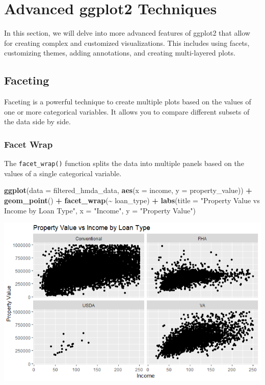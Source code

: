 \documentclass[
]{book}
\newenvironment{Shaded}{\begin{snugshade}}{\end{snugshade}}
\newcommand{\AttributeTok}[1]{\textcolor[rgb]{0.13,0.29,0.53}{#1}}
\newcommand{\FunctionTok}[1]{\textcolor[rgb]{0.13,0.29,0.53}{\textbf{#1}}}
\newcommand{\NormalTok}[1]{#1}
\newcommand{\SpecialCharTok}[1]{\textcolor[rgb]{0.81,0.36,0.00}{\textbf{#1}}}
\newcommand{\StringTok}[1]{\textcolor[rgb]{0.31,0.60,0.02}{#1}}
\begin{document}
\hypertarget{advanced-ggplot2-techniques}{%
\section{Advanced ggplot2 Techniques}\label{advanced-ggplot2-techniques}}

In this section, we will delve into more advanced features of ggplot2 that allow for creating complex and customized visualizations. This includes using facets, customizing themes, adding annotations, and creating multi-layered plots.

\hypertarget{faceting}{%
\subsection{Faceting}\label{faceting}}

Faceting is a powerful technique to create multiple plots based on the values of one or more categorical variables. It allows you to compare different subsets of the data side by side.

\hypertarget{facet-wrap}{%
\subsubsection*{Facet Wrap}\label{facet-wrap}}

The \texttt{facet\_wrap()} function splits the data into multiple panels based on the values of a single categorical variable.

\begin{Shaded}
\begin{Highlighting}[]
\FunctionTok{ggplot}\NormalTok{(}\AttributeTok{data =}\NormalTok{ filtered\_hmda\_data, }\FunctionTok{aes}\NormalTok{(}\AttributeTok{x =}\NormalTok{ income, }\AttributeTok{y =}\NormalTok{ property\_value)) }\SpecialCharTok{+}
  \FunctionTok{geom\_point}\NormalTok{() }\SpecialCharTok{+}
  \FunctionTok{facet\_wrap}\NormalTok{(}\SpecialCharTok{\textasciitilde{}}\NormalTok{ loan\_type) }\SpecialCharTok{+}
  \FunctionTok{labs}\NormalTok{(}\AttributeTok{title =} \StringTok{"Property Value vs Income by Loan Type"}\NormalTok{,}
       \AttributeTok{x =} \StringTok{"Income"}\NormalTok{,}
       \AttributeTok{y =} \StringTok{"Property Value"}\NormalTok{)}
\end{Highlighting}
\end{Shaded}

\includegraphics{images/facet_wrap.PNG}
\end{document}
